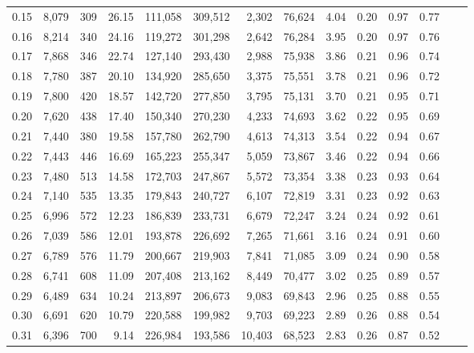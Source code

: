 \begin{tabular}{rrrrrrrrrrrrrr}
0.15 &  8,079 &    309 &   26.15 &  111,058 &  309,512 &   2,302 &  76,624 &  4.04 &  0.20 &  0.97 &      0.77 \\
0.16 &  8,214 &    340 &   24.16 &  119,272 &  301,298 &   2,642 &  76,284 &  3.95 &  0.20 &  0.97 &      0.76 \\
0.17 &  7,868 &    346 &   22.74 &  127,140 &  293,430 &   2,988 &  75,938 &  3.86 &  0.21 &  0.96 &      0.74 \\
0.18 &  7,780 &    387 &   20.10 &  134,920 &  285,650 &   3,375 &  75,551 &  3.78 &  0.21 &  0.96 &      0.72 \\
0.19 &  7,800 &    420 &   18.57 &  142,720 &  277,850 &   3,795 &  75,131 &  3.70 &  0.21 &  0.95 &      0.71 \\
0.20 &  7,620 &    438 &   17.40 &  150,340 &  270,230 &   4,233 &  74,693 &  3.62 &  0.22 &  0.95 &      0.69 \\
0.21 &  7,440 &    380 &   19.58 &  157,780 &  262,790 &   4,613 &  74,313 &  3.54 &  0.22 &  0.94 &      0.67 \\
0.22 &  7,443 &    446 &   16.69 &  165,223 &  255,347 &   5,059 &  73,867 &  3.46 &  0.22 &  0.94 &      0.66 \\
0.23 &  7,480 &    513 &   14.58 &  172,703 &  247,867 &   5,572 &  73,354 &  3.38 &  0.23 &  0.93 &      0.64 \\
0.24 &  7,140 &    535 &   13.35 &  179,843 &  240,727 &   6,107 &  72,819 &  3.31 &  0.23 &  0.92 &      0.63 \\
0.25 &  6,996 &    572 &   12.23 &  186,839 &  233,731 &   6,679 &  72,247 &  3.24 &  0.24 &  0.92 &      0.61 \\
0.26 &  7,039 &    586 &   12.01 &  193,878 &  226,692 &   7,265 &  71,661 &  3.16 &  0.24 &  0.91 &      0.60 \\
0.27 &  6,789 &    576 &   11.79 &  200,667 &  219,903 &   7,841 &  71,085 &  3.09 &  0.24 &  0.90 &      0.58 \\
0.28 &  6,741 &    608 &   11.09 &  207,408 &  213,162 &   8,449 &  70,477 &  3.02 &  0.25 &  0.89 &      0.57 \\
0.29 &  6,489 &    634 &   10.24 &  213,897 &  206,673 &   9,083 &  69,843 &  2.96 &  0.25 &  0.88 &      0.55 \\
0.30 &  6,691 &    620 &   10.79 &  220,588 &  199,982 &   9,703 &  69,223 &  2.89 &  0.26 &  0.88 &      0.54 \\
0.31 &  6,396 &    700 &    9.14 &  226,984 &  193,586 &  10,403 &  68,523 &  2.83 &  0.26 &  0.87 &      0.52 \\

\end{tabular}
